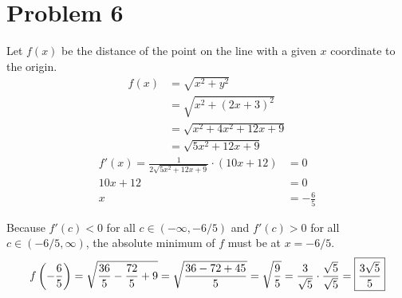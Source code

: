 \documentclass{article}
\newcommand*{\paren}[1]{\ensuremath\left(#1\right)}
\newcommand*{\problem}[1]{\section*{Problem #1}}
\begin{document}
\problem{6}
Let $f(x)$ be the distance of the point on the line with a given $x$ coordinate to the origin.
\begin{align*}
	f(x)&=\sqrt{x^2+y^2} \\
	&=\sqrt{x^2+(2x+3)^2} \\
	&=\sqrt{x^2+4x^2+12x+9} \\
	&=\sqrt{5x^2+12x+9}
\end{align*}
\begin{align*}
	f'(x)=\frac{1}{2\sqrt{5x^2+12x+9}}\cdot(10x+12)&=0 \\
	10x+12&=0 \\
	x&=-\frac{6}{5}
\end{align*}
\begin{center}
\end{center}
Because $f'(c)<0$ for all $c\in(-\infty,-6/5)$ and $f'(c)>0$ for all $c\in(-6/5,\infty)$, the absolute minimum of $f$ must be at $x=-6/5$.
\begin{equation*}
	f\paren{-\frac65}
	=\sqrt{\frac{36}{5}-\frac{72}{5}+9}
	=\sqrt{\frac{36-72+45}5}
	=\sqrt{\frac95}
	=\frac{3}{\sqrt{5}}\cdot\frac{\sqrt{5}}{\sqrt{5}}
	=\boxed{\frac{3\sqrt{5}}{5}}
\end{equation*}
\end{document}
